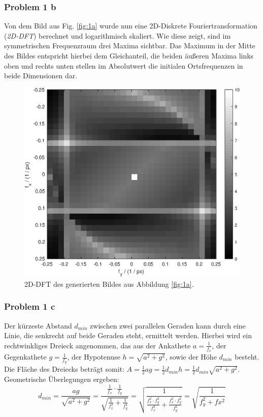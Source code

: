 \subsubsection{Problem 1 b}
Von dem Bild aus Fig. \ref{fig:1a} wurde nun eine 2D-Diskrete Fouriertransformation (\textit{2D-DFT}) berechnet und logarithmisch skaliert. Wie diese zeigt, sind im symmetrischen Frequenzraum drei Maxima sichtbar. Das Maximum in der Mitte des Bildes entspricht hierbei dem Gleichanteil, die beiden äußeren Maxima links oben und rechts unten stellen im Absolutwert die initialen Ortsfrequenzen in beide Dimensionen dar.
\begin{figure}[h]
    \captionsetup{width=0.8\columnwidth}
    \centering
    \includegraphics[width=.4\columnwidth]{ue5/1b.eps}
    \caption{2D-DFT des generierten Bildes aus Abbildung \ref{fig:1a}.}
    \label{fig:1b}
\end{figure}

\subsubsection{Problem 1 c}

Der kürzeste Abstand $d_{min}$ zwischen zwei parallelen Geraden kann durch eine Linie, die senkrecht auf beide Geraden steht, ermittelt werden. Hierbei wird ein rechtwinkliges Dreieck angenommen, das aus der Ankathete $a = \frac{1}{f_x}$, der Gegenkathete $g = \frac{1}{f_y}$, der Hypotenuse $h = \sqrt{a^2+g^2}$, sowie der Höhe $d_{min}$ besteht. Die Fläche des Dreiecks beträgt somit: $A = \frac{1}{2} a g = \frac{1}{2} d_{min} h = \frac{1}{2} d_{min} \sqrt{a^2 + g^2}$.
\vspace{2pt}
Geometrische Überlegungen ergeben:
$$d_{min} = \frac{a g}{\sqrt{a^2 + g^2}} = \frac{\frac{1}{f_x} \cdot \frac{1}{f_y}}{\sqrt{\frac{1}{f_x^2} + \frac{1}{f_y^2}}} = \sqrt{\frac{1}{\frac{f_x^2 \cdot f_y^2}{f_x^2} + \frac{f_x^2 \cdot f_y^2}{f_y^2}}} = \sqrt{\frac{1}{f_y^2+fx^2}}$$

